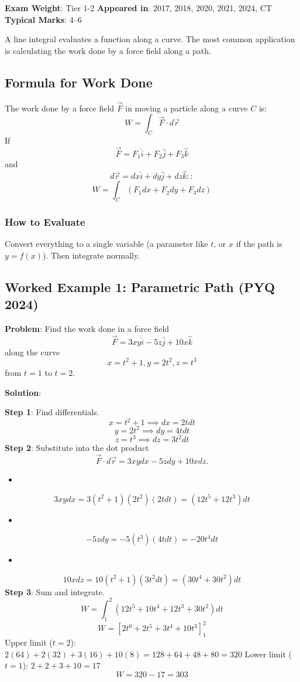 \documentclass[
]{article}
\providecommand{\tightlist}{%
  \setlength{\itemsep}{0pt}\setlength{\parskip}{0pt}}
\renewenvironment{quote}
  {\begin{tcolorbox}[
     colback=calloutbg,
     colframe=calloutframe,
     colupper=callouttext,
     arc=3pt,
     boxrule=0.5pt,
     leftrule=0.5pt,
     borderline west={3pt}{0pt}{calloutaccent},
     left=8pt,
     right=8pt,
     top=6pt,
     bottom=6pt
   ]}
  {\end{tcolorbox}}
\begin{document}
\begin{quote}
\textbf{Exam Weight}: Tier 1-2 \textbar{} \textbf{Appeared in}: 2017,
2018, 2020, 2021, 2024, CT \textbar{} \textbf{Typical Marks}: 4--6
\end{quote}

A line integral evaluates a function along a curve. The most common
application is calculating the work done by a force field along a path.

\subsection{Formula for Work Done}\label{formula-for-work-done}

The work done by a force field \(\vec{F}\) in moving a particle along a
curve \(C\) is:
\[
W = \int_C \vec{F} \cdot d\vec{r}
\]
If
\[
\vec{F} = F_1\hat{i} + F_2\hat{j} + F_3\hat{k}
\]
and
\[
d\vec{r} = dx\hat{i} + dy\hat{j} + dz\hat{k}::
\]
\[
W = \int_C (F_1 dx + F_2 dy + F_3 dz)
\]
\subsubsection{How to Evaluate}\label{how-to-evaluate}

Convert everything to a single variable (a parameter like \(t\), or
\(x\) if the path is \(y = f(x)\)). Then integrate normally.

\subsection{Worked Example 1: Parametric Path (PYQ
2024)}\label{worked-example-1-parametric-path-pyq-2024}

\textbf{Problem}: Find the work done in a force field
\[
\vec{F} = 3xy\hat{i} - 5z\hat{j} + 10x\hat{k}
\]
along the curve
\[
x = t^2 + 1, y = 2t^2, z = t^3
\]
from \(t = 1\) to \(t = 2\).

\textbf{Solution}:

\textbf{Step 1}: Find differentials.
\[
x = t^2 + 1 \implies dx = 2t dt
\]
\[
y = 2t^2 \implies dy = 4t dt
\]
\[
z = t^3 \implies dz = 3t^2 dt
\]
\textbf{Step 2}: Substitute into the dot product
\[
\vec{F} \cdot d\vec{r} = 3xy dx - 5z dy + 10x dz.
\]
\begin{itemize}
\tightlist
\item
\end{itemize}
\[
3xy dx = 3(t^2 + 1)(2t^2)(2t dt) = (12t^5 + 12t^3) dt
\]
\begin{itemize}
\tightlist
\item
\end{itemize}
\[
-5z dy = -5(t^3)(4t dt) = -20t^4 dt
\]
\begin{itemize}
\tightlist
\item
\end{itemize}
\[
10x dz = 10(t^2 + 1)(3t^2 dt) = (30t^4 + 30t^2) dt
\]
\textbf{Step 3}: Sum and integrate.
\[
W = \int_1^2 (12t^5 + 10t^4 + 12t^3 + 30t^2) dt
\]
\[
W = \left[ 2t^6 + 2t^5 + 3t^4 + 10t^3 \right]_1^2
\]
Upper limit (\(t=2\)):
\(2(64) + 2(32) + 3(16) + 10(8) = 128 + 64 + 48 + 80 = 320\) Lower limit
(\(t=1\)): \(2 + 2 + 3 + 10 = 17\)
\[
W = 320 - 17 = 303
\]
\end{document}
